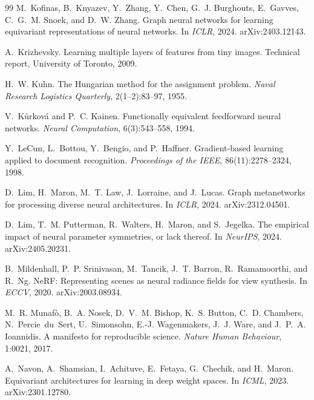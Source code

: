 \documentclass[10pt,twocolumn,letterpaper]{article}
\theoremstyle{definition}
\begin{document}
\begin{thebibliography}{99}
M.~Kofinas, B.~Knyazev, Y.~Zhang, Y.~Chen, G.~J. Burghouts, E.~Gavves, C.~G.~M. Snoek, and
D.~W. Zhang.
\newblock Graph neural networks for learning equivariant representations of neural networks.
\newblock In \emph{ICLR}, 2024. arXiv:2403.12143.

A.~Krizhevsky.
\newblock Learning multiple layers of features from tiny images.
\newblock Technical report, University of Toronto, 2009.

H.~W. Kuhn.
\newblock The Hungarian method for the assignment problem.
\newblock \emph{Naval Research Logistics Quarterly}, 2(1--2):83--97, 1955.

V.~K\r{u}rkov\'a and P.~C. Kainen.
\newblock Functionally equivalent feedforward neural networks.
\newblock \emph{Neural Computation}, 6(3):543--558, 1994.

Y.~LeCun, L.~Bottou, Y.~Bengio, and P.~Haffner.
\newblock Gradient-based learning applied to document recognition.
\newblock \emph{Proceedings of the IEEE}, 86(11):2278--2324, 1998.

D.~Lim, H.~Maron, M.~T. Law, J.~Lorraine, and J.~Lucas.
\newblock Graph metanetworks for processing diverse neural architectures.
\newblock In \emph{ICLR}, 2024. arXiv:2312.04501.

D.~Lim, T.~M. Putterman, R.~Walters, H.~Maron, and S.~Jegelka.
\newblock The empirical impact of neural parameter symmetries, or lack thereof.
\newblock In \emph{NeurIPS}, 2024. arXiv:2405.20231.

B.~Mildenhall, P.~P. Srinivasan, M.~Tancik, J.~T. Barron, R.~Ramamoorthi, and R.~Ng.
\newblock NeRF: Representing scenes as neural radiance fields for view synthesis.
\newblock In \emph{ECCV}, 2020. arXiv:2003.08934.

M.~R. Munaf\`o, B.~A. Nosek, D.~V.~M. Bishop, K.~S. Button, C.~D. Chambers, N.~Percie~du~Sert,
U.~Simonsohn, E.-J. Wagenmakers, J.~J. Ware, and J.~P.~A. Ioannidis.
\newblock A manifesto for reproducible science.
\newblock \emph{Nature Human Behaviour}, 1:0021, 2017.

A.~Navon, A.~Shamsian, I.~Achituve, E.~Fetaya, G.~Chechik, and H.~Maron.
\newblock Equivariant architectures for learning in deep weight spaces.
\newblock In \emph{ICML}, 2023. arXiv:2301.12780.


\end{thebibliography}
\end{document}
